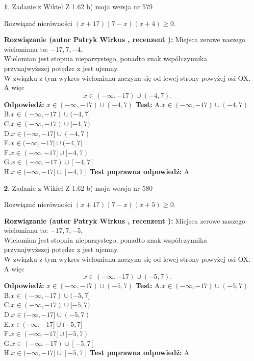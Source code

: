\documentclass[12pt, a4paper]{article}
\theoremstyle{definition} %
\newtheorem{zad}{}
\newcommand{\zadStart}[1]{\begin{zad}#1\newline}
\newcommand{\zadStop}{\end{zad}}
\newcommand{\rozwStart}[2]{\noindent \textbf{Rozwiązanie (autor #1 , recenzent #2): }\newline}
\newcommand{\rozwStop}{\newline}
\newcommand{\odpStart}{\noindent \textbf{Odpowiedź:}\newline}
\newcommand{\odpStop}{\newline}
\newcommand{\testStart}{\noindent \textbf{Test:}\newline}
\newcommand{\testStop}{\newline}
\newcommand{\kluczStart}{\noindent \textbf{Test poprawna odpowiedź:}\newline}
\newcommand{\kluczStop}{\newline}
\begin{document}
\zadStart{Zadanie z Wikieł Z 1.62 b) moja wersja nr 579}

Rozwiązać nierówności $(x+17)(7-x)(x+4)\ge0$.
\zadStop
\rozwStart{Patryk Wirkus}{}
Miejsca zerowe naszego wielomianu to: $-17, 7, -4$.\\
Wielomian jest stopnia nieparzystego, ponadto znak współczynnika przy\linebreak najwyższej potędze x jest ujemny.\\ W związku z tym wykres wielomianu zaczyna się od lewej strony powyżej osi OX. A więc $$x \in (-\infty,-17) \cup (-4,7).$$
\rozwStop
\odpStart
$x \in (-\infty,-17) \cup (-4,7)$
\odpStop
\testStart
A.$x \in (-\infty,-17) \cup (-4,7)$\\
B.$x \in (-\infty,-17) \cup (-4,7]$\\
C.$x \in (-\infty,-17) \cup [-4,7)$\\
D.$x \in (-\infty,-17] \cup (-4,7)$\\
E.$x \in (-\infty,-17] \cup (-4,7]$\\
F.$x \in (-\infty,-17] \cup [-4,7)$\\
G.$x \in (-\infty,-17) \cup [-4,7]$\\
H.$x \in (-\infty,-17] \cup [-4,7]$
\testStop
\kluczStart
A
\kluczStop



\zadStart{Zadanie z Wikieł Z 1.62 b) moja wersja nr 580}

Rozwiązać nierówności $(x+17)(7-x)(x+5)\ge0$.
\zadStop
\rozwStart{Patryk Wirkus}{}
Miejsca zerowe naszego wielomianu to: $-17, 7, -5$.\\
Wielomian jest stopnia nieparzystego, ponadto znak współczynnika przy\linebreak najwyższej potędze x jest ujemny.\\ W związku z tym wykres wielomianu zaczyna się od lewej strony powyżej osi OX. A więc $$x \in (-\infty,-17) \cup (-5,7).$$
\rozwStop
\odpStart
$x \in (-\infty,-17) \cup (-5,7)$
\odpStop
\testStart
A.$x \in (-\infty,-17) \cup (-5,7)$\\
B.$x \in (-\infty,-17) \cup (-5,7]$\\
C.$x \in (-\infty,-17) \cup [-5,7)$\\
D.$x \in (-\infty,-17] \cup (-5,7)$\\
E.$x \in (-\infty,-17] \cup (-5,7]$\\
F.$x \in (-\infty,-17] \cup [-5,7)$\\
G.$x \in (-\infty,-17) \cup [-5,7]$\\
H.$x \in (-\infty,-17] \cup [-5,7]$
\testStop
\kluczStart
A
\kluczStop
\end{document}
